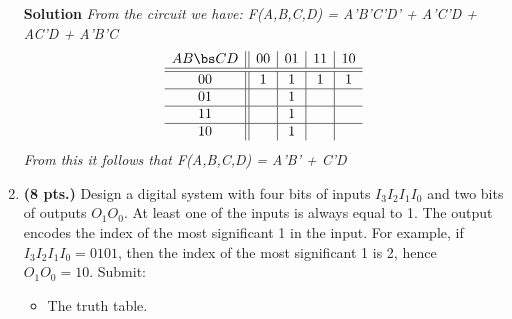 \begin{enumerate}
        \begin{onlysolution}  \textbf{Solution} \itshape{
                From the circuit we have:
                F(A,B,C,D) = A'B'C'D' + A'C'D + AC'D + A'B'C
                $$
                \begin{array} {c||c|c|c|c}
                    AB \bs CD & 00 & 01 & 11 & 10 \\ \hline \hline
                    00        & 1  & 1  & 1  & 1  \\ \hline
                    01        &    & 1  &    &    \\ \hline
                    11        &    & 1  &    &    \\ \hline
                    10        &    & 1  &    &    \\
                \end{array} $$
                From this it follows that
                F(A,B,C,D) =  A'B' + C'D
            }
        \end{onlysolution}

    \item  \textbf{ (8 pts.)} Design a digital system with four bits of inputs
        $I_3 I_2 I_1 I_0$ and two bits of outputs $O_1 O_0$.  At least one
        of the inputs is always equal to 1.  The output encodes the
        index of the most significant 1 in the input.
        For example, if $I_3 I_2 I_1 I_0 = 0101$, then the index
        of the most significant 1 is 2, hence $O_1 O_0 = 10$.  Submit:
        \begin{itemize}
            \item The truth table.


\end{itemize}
\end{enumerate}
